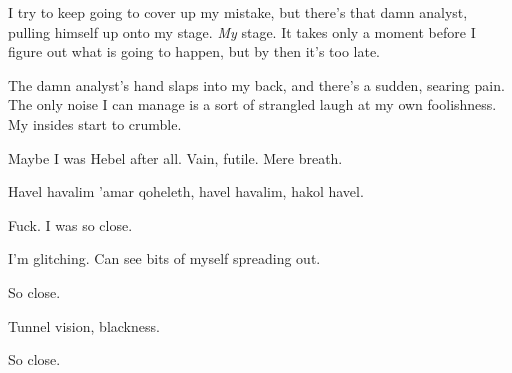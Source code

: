I try to keep going to cover up my mistake, but there's that damn analyst, pulling himself up onto my stage. \emph{My} stage. It takes only a moment before I figure out what is going to happen, but by then it's too late.

The damn analyst's hand slaps into my back, and there's a sudden, searing pain. The only noise I can manage is a sort of strangled laugh at my own foolishness. My insides start to crumble.

Maybe I was Hebel after all. Vain, futile. Mere breath.

Havel havalim 'amar qoheleth, havel havalim, hakol havel.

Fuck. I was so close.

I'm glitching. Can see bits of myself spreading out.

So close.

Tunnel vision, blackness.

So close.
